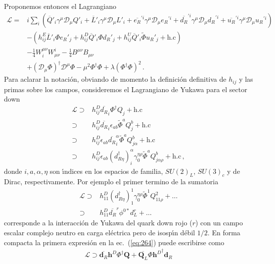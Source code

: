 Proponemos entonces el Lagrangiano
\begin{align}
\label{eq:265}
     \mathcal{L}=&i\sum_i\left(\overline{Q}'_i\gamma^\mu\mathcal{D}_\mu Q'_i+\overline{L}'_i\gamma^\mu\mathcal{D}_\mu L'_i+
\overline{e_R}^{\prime i}\gamma^\mu\mathcal{D}_\mu {e_R}^{\prime i}+\overline{d_R}^{\prime i}\gamma^\mu\mathcal{D}_\mu {d_R}^{\prime i}+\overline{u_R}^{\prime i}\gamma^\mu\mathcal{D}_\mu {u_R}^{\prime i}\right)
\nonumber\\
     &-(h_{ij}^E\overline{L}'_i\Phi {e_R}'_j+h_{ij}^D\overline{Q}'_i\Phi {d_R}'_j+h_{ij}^U\overline{Q}'_i\widetilde{\Phi}{u_R}'_j+\text{h.c})\nonumber\\
     &-\tfrac{1}{4}W^{\mu\nu}_i W_{\mu\nu}^i-\tfrac{1}{4}B^{\mu\nu} B_{\mu\nu}\nonumber\\
     &+(\mathcal{D}_\mu\Phi)^\dagger\mathcal{D}^\mu\Phi-\mu^2\Phi^\dagger\Phi+\lambda(\Phi^\dagger\Phi)^2\,.
\end{align}
Para aclarar la notaci\'on, obviando de momento la definici\'on definitiva de $h_{ij}$ y las primas sobre los campos, consideremos el Lagrangiano de Yukawa para el sector down
\begin{align}
  \label{eq:264}
  \mathcal{L}\supset&h^D_{ij}\overline{d_R}_i\Phi^\dagger Q_j+\text{h.c}\nonumber\\
\supset&h^D_{ij}\overline{d_R}_i\epsilon_{ab}\widetilde{\Phi}^aQ_j^b+\text{h.c}\nonumber\\
\supset&h^D_{ij}\epsilon_{ab}\overline{d_R}_i^\alpha\widetilde{\Phi}^aQ_{j\alpha}^b+\text{h.c}\nonumber\\
\supset&h^D_{ij}\epsilon_{ab}{(d_{R\eta}^\dagger)}_i^\alpha\gamma_0^{\eta\rho}\widetilde{\Phi}^aQ_{j\alpha\rho}^b+\text{h.c}\,,
\end{align}
donde $i,a,\alpha,\eta$ son \'\i ndices en los espacios de familia, $SU(2)_L$, $SU(3)_c$ y de Dirac, respectivamente. Por ejemplo el primer termino de la sumatoria 
\begin{align}
\mathcal{L}\supset&h^D_{11}{(d_{R\eta}^\dagger)}_1^1\gamma_0^{\eta\rho}\widetilde{\Phi}^1Q_{11\rho}^2+\ldots\nonumber\\
\supset&h^D_{11}\overline{d_R}^r\phi^{0*}d_{L}^r+\ldots\,
\end{align}
corresponde a la interacci\'on de Yukawa del quark down rojo ($r$) con un campo escalar complejo neutro en carga el\'ectrica pero de isosp\'\i n d\'ebil $1/2$. En forma compacta la primera expresi\'on en la ec.~(\ref{eq:264}) puede escribirse como
\begin{align}
  \mathcal{L}\supset\overline{\mathbf{d}_R} \mathbf{h}^D \Phi^\dagger \mathbf{Q}+\overline{\mathbf{Q}_L}\Phi{\mathbf{h}^{D}}^\dagger  \mathbf{d}_R
\end{align}
